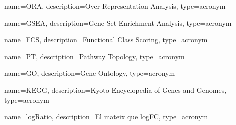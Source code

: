 




\newcommand{\myLaT}{\LaTeX{}@TUG\xspace} %







\makenoidxglossaries
{}
{
    name=ORA,
    description={Over-Representation Analysis},
type={acronym}
}

{
    name={GSEA},
    description={Gene Set Enrichment Analysis},
type={acronym}
}


{
    name={FCS},
    description={Functional Class Scoring},
type={acronym}
}

{
    name={PT},
    description={Pathway Topology},
type={acronym}
}

{
    name={GO},
    description={Gene Ontology},
type={acronym}
}

{
    name={KEGG},
    description={Kyoto Encyclopedia of Genes and Genomes},
type={acronym}
}

{
    name={logRatio},
    description={El mateix que logFC},
type={acronym}
}

